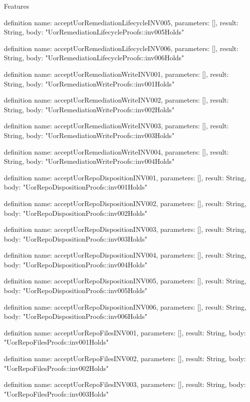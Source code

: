 \begin{lexlean}{Features}
\begin{semanticmodule}
definition{
  name: acceptUorRemediationLifecycleINV005,
  parameters: [],
  result: String,
  body: "UorRemediationLifecycleProofs::inv005Holds"
}

definition{
  name: acceptUorRemediationLifecycleINV006,
  parameters: [],
  result: String,
  body: "UorRemediationLifecycleProofs::inv006Holds"
}

definition{
  name: acceptUorRemediationWriteINV001,
  parameters: [],
  result: String,
  body: "UorRemediationWriteProofs::inv001Holds"
}

definition{
  name: acceptUorRemediationWriteINV002,
  parameters: [],
  result: String,
  body: "UorRemediationWriteProofs::inv002Holds"
}

definition{
  name: acceptUorRemediationWriteINV003,
  parameters: [],
  result: String,
  body: "UorRemediationWriteProofs::inv003Holds"
}

definition{
  name: acceptUorRemediationWriteINV004,
  parameters: [],
  result: String,
  body: "UorRemediationWriteProofs::inv004Holds"
}

definition{
  name: acceptUorRepoDispositionINV001,
  parameters: [],
  result: String,
  body: "UorRepoDispositionProofs::inv001Holds"
}

definition{
  name: acceptUorRepoDispositionINV002,
  parameters: [],
  result: String,
  body: "UorRepoDispositionProofs::inv002Holds"
}

definition{
  name: acceptUorRepoDispositionINV003,
  parameters: [],
  result: String,
  body: "UorRepoDispositionProofs::inv003Holds"
}

definition{
  name: acceptUorRepoDispositionINV004,
  parameters: [],
  result: String,
  body: "UorRepoDispositionProofs::inv004Holds"
}

definition{
  name: acceptUorRepoDispositionINV005,
  parameters: [],
  result: String,
  body: "UorRepoDispositionProofs::inv005Holds"
}

definition{
  name: acceptUorRepoDispositionINV006,
  parameters: [],
  result: String,
  body: "UorRepoDispositionProofs::inv006Holds"
}

definition{
  name: acceptUorRepoFilesINV001,
  parameters: [],
  result: String,
  body: "UorRepoFilesProofs::inv001Holds"
}

definition{
  name: acceptUorRepoFilesINV002,
  parameters: [],
  result: String,
  body: "UorRepoFilesProofs::inv002Holds"
}

definition{
  name: acceptUorRepoFilesINV003,
  parameters: [],
  result: String,
  body: "UorRepoFilesProofs::inv003Holds"
}


\end{semanticmodule}
\end{lexlean}
